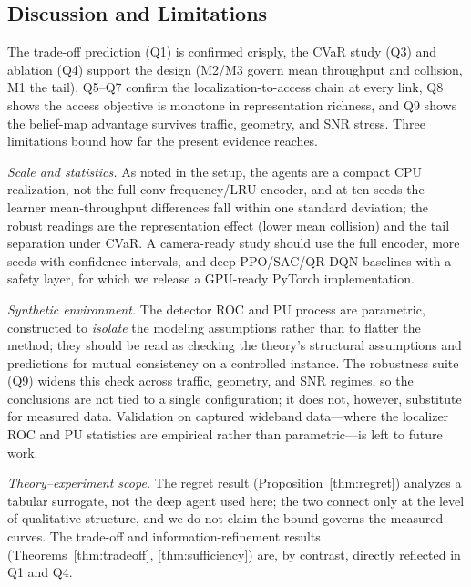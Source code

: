 \subsection{Discussion and Limitations}
\label{subsec:limitations}
The trade-off prediction (Q1) is confirmed crisply, the CVaR study (Q3) and
ablation (Q4) support the design (M2/M3 govern mean throughput and collision,
M1 the tail), Q5--Q7 confirm the localization-to-access chain at every link,
Q8 shows the access objective is monotone in representation richness, and Q9
shows the belief-map advantage survives traffic, geometry, and SNR stress.
Three limitations bound how far the present evidence reaches.

\emph{Scale and statistics.} As noted in the setup, the agents are a compact
CPU realization, not the full conv-frequency/LRU encoder, and at ten seeds the
learner mean-throughput differences fall within one standard deviation; the
robust readings are the representation effect (lower mean collision) and the
tail separation under CVaR. A camera-ready study should use the full encoder,
more seeds with confidence intervals, and deep PPO/SAC/QR-DQN baselines with a
safety layer, for which we release a GPU-ready PyTorch implementation.

\emph{Synthetic environment.} The detector ROC and PU process are parametric,
constructed to \emph{isolate} the modeling assumptions rather than to flatter
the method; they should be read as checking the theory's structural
assumptions and predictions for mutual consistency on a controlled instance.
The robustness suite (Q9) widens this check across traffic, geometry, and SNR
regimes, so the conclusions are not tied to a single configuration; it does
not, however, substitute for measured data. Validation on captured wideband
data---where the localizer ROC and PU statistics are empirical rather than
parametric---is left to future work.

\emph{Theory--experiment scope.} The regret result
(Proposition~\ref{thm:regret}) analyzes a tabular surrogate, not the deep agent
used here; the two connect only at the level of qualitative structure, and we
do not claim the bound governs the measured curves. The trade-off and
information-refinement results
(Theorems~\ref{thm:tradeoff}, \ref{thm:sufficiency}) are, by contrast,
directly reflected in Q1 and Q4.
